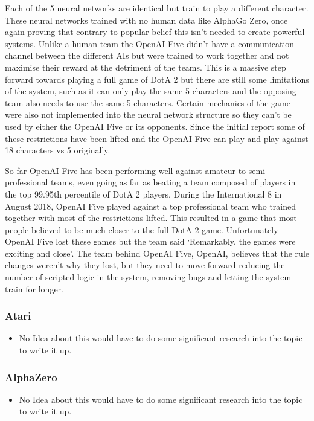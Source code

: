 \documentclass[a4paper]{article}
\begin{document}
Each of the 5 neural networks are identical but train to play a different character.
These neural networks trained with no human data like AlphaGo Zero, once again proving that contrary to popular belief this isn't needed to create powerful systems.
Unlike a human team the OpenAI Five didn't have a communication channel between the different AIs but were trained to work together and not maximise their reward at the detriment of the teams.
This is a massive step forward towards playing a full game of DotA 2 but there are still some limitations of the system, such as it can only play the same 5 characters and the opposing team also needs to use the same 5 characters.
Certain mechanics of the game were also not implemented into the neural network structure so they can't be used by either the OpenAI Five or its opponents.
Since the initial report some of these restrictions have been lifted and the OpenAI Five can play and play against 18 characters vs 5 originally.
\par
So far OpenAI Five has been performing well against amateur to semi-professional teams, even going as far as beating a team composed of players in the top 99.95th percentile of DotA 2 players.
During the International 8 in August 2018, OpenAI Five played against a top professional team who trained together with most of the restrictions lifted.
This resulted in a game that most people believed to be much closer to the full DotA 2 game.
Unfortunately OpenAI Five lost these games but the team said `Remarkably, the games were exciting and close'\cite{OpenAIInternational}.
The team behind OpenAI Five, OpenAI, believes that the rule changes weren't why they lost, but they need to move forward reducing the number of scripted logic in the system, removing bugs and letting the system train for longer.

\subsubsection{Atari}
\begin{itemize}
    \item No Idea about this would have to do some significant research into the topic to write it up.
\end{itemize}

\subsubsection{AlphaZero}
\begin{itemize}
    \item No Idea about this would have to do some significant research into the topic to write it up.
\end{itemize}
\end{document}
